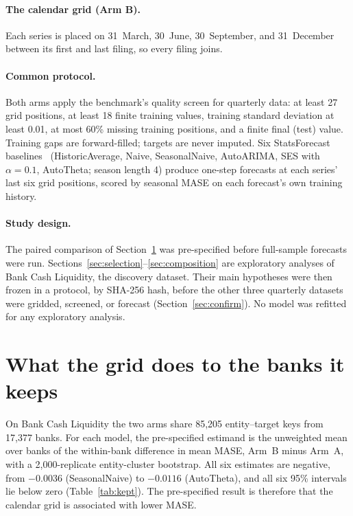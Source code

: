 \documentclass[11pt]{article}
\begin{document}
\paragraph{The calendar grid (Arm B).} Each series is placed on 31~March, 30~June, 30~September, and 31~December between its first and last filing, so every filing joins.

\paragraph{Common protocol.} Both arms apply the benchmark's quality screen for quarterly data: at least 27 grid positions, at least 18 finite training values, training standard deviation at least 0.01, at most 60\% missing training positions, and a finite final (test) value. Training gaps are forward-filled; targets are never imputed. Six StatsForecast baselines~\cite{statsforecast} (HistoricAverage, Naive, SeasonalNaive, AutoARIMA, SES with $\alpha=0.1$, AutoTheta; season length 4) produce one-step forecasts at each series' last six grid positions, scored by seasonal MASE on each forecast's own training history.

\paragraph{Study design.} The paired comparison of Section~\ref{sec:kept} was pre-specified before full-sample forecasts were run. Sections~\ref{sec:selection}--\ref{sec:composition} are exploratory analyses of Bank Cash Liquidity, the discovery dataset. Their main hypotheses were then frozen in a protocol, by SHA-256 hash, before the other three quarterly datasets were gridded, screened, or forecast (Section~\ref{sec:confirm}). No model was refitted for any exploratory analysis.

\section{What the grid does to the banks it keeps}\label{sec:kept}
On Bank Cash Liquidity the two arms share 85,205 entity--target keys from 17,377 banks. For each model, the pre-specified estimand is the unweighted mean over banks of the within-bank difference in mean MASE, Arm~B minus Arm~A, with a 2,000-replicate entity-cluster bootstrap. All six estimates are negative, from $-0.0036$ (SeasonalNaive) to $-0.0116$ (AutoTheta), and all six 95\% intervals lie below zero (Table~\ref{tab:kept}). The pre-specified result is therefore that the calendar grid is associated with lower MASE.
\end{document}
